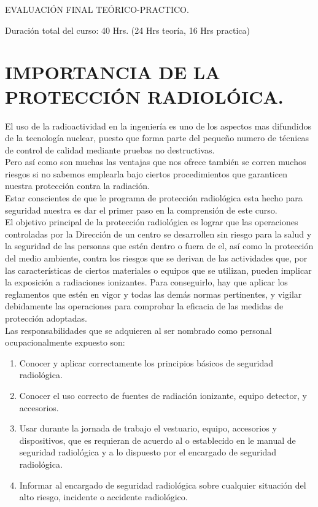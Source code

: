 \documentclass[11pt, oneside]{book}
\begin{document}
\begin{flushleft}
  EVALUACI\'ON FINAL TE\'ORICO-PRACTICO.

  Duraci\'on total del curso: 40 Hrs. (24 Hrs teor\'ia, 16 Hrs practica)
\end{flushleft}

\chapter {IMPORTANCIA DE LA PROTECCI\'ON RADIOL\'OICA.}
El uso de la radioactividad en la ingeniería es uno de los aspectos mas difundidos de la tecnología nuclear, puesto
que forma parte del pequeño numero de técnicas de control de calidad mediante pruebas no destructivas.\\

Pero así como son muchas las ventajas que nos ofrece también se corren muchos
riesgos si no sabemos emplearla bajo ciertos procedimientos que garanticen nuestra
protección contra la radiación.\\

Estar conscientes de que le programa de protección radiológica esta hecho para seguridad nuestra es dar el primer paso en la comprensión de este curso.\\

El objetivo principal de la protección radiológica es lograr que las operaciones controladas por la Dirección de un centro se desarrollen sin riesgo para la salud y la seguridad de las personas que estén dentro o fuera de el, así como la protección del medio ambiente, contra los riesgos que se derivan de las actividades que, por las características de ciertos materiales o equipos que se utilizan, pueden implicar la exposición a radiaciones ionizantes. Para conseguirlo, hay que aplicar los reglamentos que estén en vigor y todas las demás normas pertinentes, y vigilar debidamente las operaciones para comprobar la eficacia de las medidas de protección adoptadas.\\


Las responsabilidades que se adquieren al ser nombrado como personal ocupacionalmente expuesto son:
\begin{enumerate}
  \item Conocer y aplicar correctamente los principios b\'asicos de seguridad radiol\'ogica.
  \item Conocer el uso correcto de fuentes de radiaci\'on ionizante, equipo detector, y accesorios.
  \item Usar durante la jornada de trabajo el vestuario, equipo, accesorios y dispositivos, que es requieran de acuerdo al o establecido en le manual de seguridad radiol\'ogica y a lo dispuesto por el encargado de seguridad radiol\'ogica.
  \item Informar al encargado de seguridad radiol\'ogica sobre cualquier situación del alto riesgo, incidente o accidente radiol\'ogico.
\end{enumerate}
\end{document}
